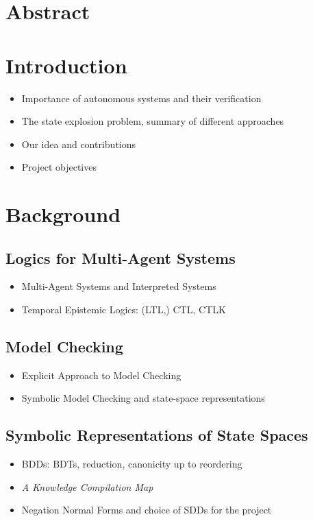 \documentclass[12]{article}
\begin{document}
\section*{Abstract}

\section{Introduction}

\begin{itemize}
\item Importance of autonomous systems and their verification
\item The state explosion problem, summary of different approaches
\item Our idea and contributions
\item Project objectives
\end{itemize}

\section{Background}

\subsection{Logics for Multi-Agent Systems}

\begin{itemize}
\item Multi-Agent Systems and Interpreted Systems
\item Temporal Epistemic Logics: (LTL,) CTL, CTLK
\end{itemize}

\subsection{Model Checking}

\begin{itemize}
\item Explicit Approach to Model Checking
\item Symbolic Model Checking and state-space representations
\end{itemize}


\subsection{Symbolic Representations of State Spaces}

\begin{itemize}
\item BDDs: BDTs, reduction, canonicity up to reordering
\item \textit{A Knowledge Compilation Map}
\item Negation Normal Forms and choice of SDDs for the project
\end{itemize}
\end{document}
